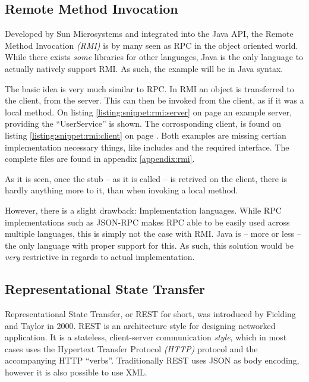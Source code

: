 		\subsection{Remote Method Invocation}
			Developed by Sun Microsystems and integrated into the Java API\cite{Downing:1998:JRR:522413}, the Remote Method Invocation \emph{(RMI)} is by many seen as RPC in the object oriented world. While there exists \emph{some} libraries for other languages, Java is the only language to actually natively support RMI. As such, the example will be in Java syntax.

			The basic idea is very much similar to RPC. In RMI an object is transferred to the client, from the server. This can then be invoked from the client, as if it was a local method. On listing \ref{listing:snippet:rmi:server} on page \pageref{listing:snippet:rmi:server} an example server, providing the ``UserService'' is shown. The corrosponding client, is found on listing \ref{listing:snippet:rmi:client} on page \pageref{listing:snippet:rmi:client}. Both examples are missing certian implementation necessary things, like includes and the required interface. The complete files are found in appendix \ref{appendix:rmi}.

			As it is seen, once the stub -- as it is called -- is retrived on the client, there is hardly anything more to it, than when invoking a local method.

			

			

			However, there is a slight drawback: Implementation languages. While RPC implementations such as JSON-RPC makes RPC able to be easily used across multiple languages, this is simply not the case with RMI. Java is -- more or less -- the only language with proper support for this. As such, this solution would be \emph{very} restrictive in regards to actual implementation.

		\subsection{Representational State Transfer}
			Representational State Transfer, or REST for short, was introduced by Fielding and Taylor \cite{Fielding:2000:PDM:337180.337228} in 2000. REST is an architecture style for designing networked application. It is a stateless, client-server communication \emph{style}, which in most cases uses the Hypertext Transfer Protocol \emph{(HTTP)} protocol and the accompanying HTTP ``verbs''. Traditionally REST uses JSON as body encoding, however it is also possible to use XML.

